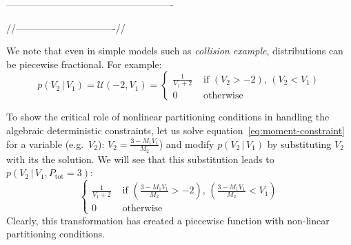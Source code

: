 \documentclass[]{article}
\newcommand{\case}[2]{#2 &\text{ if } #1}%
\newcommand{\otherwise}[1]{#1 &\text{ otherwise}}
\newcommand{\pr}{p}
\begin{document}
{%


%
}




----------------------------------------------------
{\color{blue}
//-------------------------------//

We note that even in simple models such as \emph{collision example}, distributions can be piecewise fractional. For example:  
\[
\pr(V_2 \,|\, V_1) = \mathcal{U}(-2, V_1)
=
\begin{cases}
  \case{\scriptstyle (V_2 > -2), \, (V_2 < V_1)}{\frac{1}{V_1 + 2}}\\
 \otherwise{0}
 \end{cases}
\]

To show the critical role of nonlinear partitioning conditions in handling the algebraic deterministic constraints, 
let us solve equation~\ref{eq:moment-constraint} for a variable (e.g.\ $V_2$):
$V_2 = \frac{3 - M_1 V_1}{M_2}$) and modify $\pr(V_2 \,|\, V_1)$ by substituting $V_2$ with its the solution.
We will see that this substitution leads to $\pr(V_2 \,|\, V_1, P_\text{tot} = 3)$:
\begin{equation}
\label{e:fractional-constraint}
\begin{cases}
  \case{(\frac{3 - M_1 V_1}{M_2} > -2) , \, (\frac{3 - M_1 V_1}{M_2} < V_1)}{\frac{1}{V_1 +2}}\\
  \otherwise{0}
  \end{cases}
\end{equation}
Clearly, this transformation has created a piecewise function with non-linear partitioning conditions.

}
\end{document}
